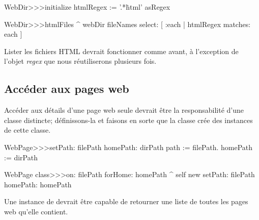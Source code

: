 \documentclass[a4paper,10pt,twoside]{book}
\begin{document}

\begin{code}{}
WebDir>>>initialize
	htmlRegex := '.*\.html' asRegex

WebDir>>>htmlFiles
	^ webDir fileNames select: [ :each | htmlRegex matches: each ]
\end{code}

Lister les fichiers HTML devrait fonctionner comme avant, à
l'exception de l'objet \emph{regex} que nous réutiliserons plusieurs
fois.

\subsection{Accéder aux pages web}

Accéder aux détails d'une page web seule devrait être la
responsabilité d'une classe distincte; définissons-la et faisons en
sorte que la classe  crée des instances de cette classe.


\begin{code}{}
WebPage>>>setPath: filePath homePath: dirPath 
	path := filePath.
	homePath := dirPath

WebPage class>>>on: filePath forHome: homePath
	^ self new setPath: filePath homePath: homePath
\end{code}

Une instance de  devrait être capable de retourner une
liste de toutes les pages web qu'elle contient.

\end{document}
